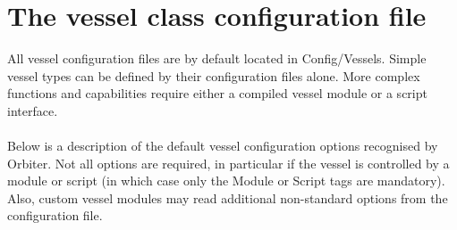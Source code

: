\documentclass[Orbiter Developer Manual.tex]{subfiles}
\begin{document}
\section{The vessel class configuration file}
All vessel configuration files are by default located in Config/Vessels. Simple vessel types can be defined by their configuration files alone. More complex functions and capabilities require either a compiled vessel module or a script interface.\\
\\
Below is a description of the default vessel configuration options recognised by Orbiter. Not all options are required, in particular if the vessel is controlled by a module or script (in which case only the Module or Script tags are mandatory). Also, custom vessel modules may read additional non-standard options from the configuration file.
\end{document}

